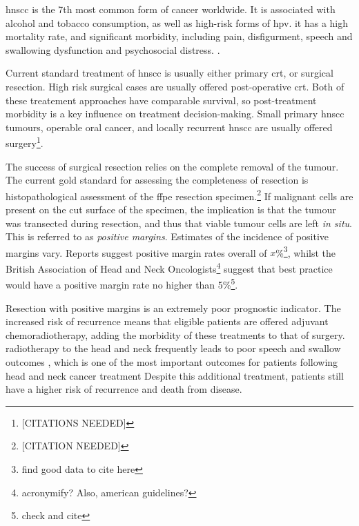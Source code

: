 
\Gls{hnscc} is the 7th most common form of cancer worldwide. 
It is associated with alcohol and tobacco consumption, as well as high-risk forms of \gls{hpv}.
it has a high mortality rate, and significant morbidity, including pain, disfigurment, speech and swallowing dysfunction and psychosocial distress. \cite{chowHeadNeckCancer2020}.

Current standard treatment of \gls{hnscc} is usually either primary \gls{crt}, or surgical resection. 
High risk surgical cases are usually offered post-operative \gls{crt}.
Both of these treatement approaches have comparable survival, so post-treatment morbidity is a key influence on treatment decision-making.
Small primary \gls{hnscc} tumours, operable oral cancer, and locally recurrent \gls{hnscc} are usually offered surgery\footnote{[CITATIONS NEEDED]}.

The success of surgical resection relies on the complete removal of the tumour.
The current gold standard for assessing the completeness of resection is histopathological assessment of the \gls{ffpe} resection specimen.\footnote{[CITATION NEEDED]}
If malignant cells are present on the cut surface of the specimen, the implication is that the tumour was transected during resection, and thus that viable tumour cells are left \textit{in situ}.
This is referred to as \emph{positive margins}.
Estimates of the incidence of positive margins vary.
Reports suggest positive margin rates overall of $x$\%\footnote{find good data to cite here}, whilst the British Association of Head and Neck Oncologists\footnote{acronymify? Also, american guidelines?} suggest that best practice would have a positive margin rate no higher than 5\%\footnote{check and cite}.

Resection with positive margins is an extremely poor prognostic indicator.
The increased risk of recurrence means that eligible patients are offered adjuvant chemoradiotherapy, adding the morbidity of these treatments to that of surgery.
radiotherapy to the head and neck frequently leads to poor speech and swallow outcomes \cite{machtayFactorsAssociatedSevere2008, wangPharyngoesophagealStrictureTreatment2012}, which is one of the most important outcomes for patients following head and neck cancer treatment \cite{wilsonDysphagiaNonsurgicalHead2011} 
Despite this additional treatment, patients still have a higher risk of recurrence and death from disease.

